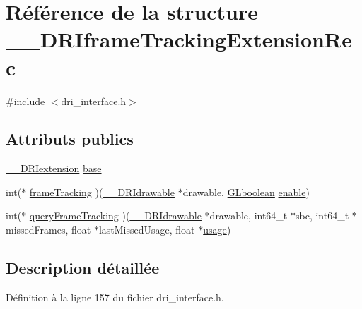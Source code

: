 \hypertarget{struct_____d_r_iframe_tracking_extension_rec}{\section{Référence de la structure \-\_\-\-\_\-\-D\-R\-Iframe\-Tracking\-Extension\-Rec}
\label{struct_____d_r_iframe_tracking_extension_rec}
}


{\ttfamily \#include $<$dri\-\_\-interface.\-h$>$}

\subsection*{Attributs publics}
\begin{DoxyCompactItemize}
\item 
\hyperlink{dri__interface_8h_a4e0a61c8ece00d2b2c6792a9a1b55385}{\-\_\-\-\_\-\-D\-R\-Iextension} \hyperlink{struct_____d_r_iframe_tracking_extension_rec_af01dbdf8b0011437192aed241ef2b420}{base}
\item 
int($\ast$ \hyperlink{struct_____d_r_iframe_tracking_extension_rec_a013f6afc10103f82b9e975f37cfc7a45}{frame\-Tracking} )(\hyperlink{dri__interface_8h_a5bfb832a0a08208d95b3bbef439d2262}{\-\_\-\-\_\-\-D\-R\-Idrawable} $\ast$drawable, \hyperlink{gl_8h_aea1419aa8aec5854bd9807b45171029d}{G\-Lboolean} \hyperlink{glext_8h_ab0b5c7de20095d30091485d2c60a3dd5}{enable})
\item 
int($\ast$ \hyperlink{struct_____d_r_iframe_tracking_extension_rec_a9d980a0990814cad8ceae79fc75b4094}{query\-Frame\-Tracking} )(\hyperlink{dri__interface_8h_a5bfb832a0a08208d95b3bbef439d2262}{\-\_\-\-\_\-\-D\-R\-Idrawable} $\ast$drawable, int64\-\_\-t $\ast$sbc, int64\-\_\-t $\ast$missed\-Frames, float $\ast$last\-Missed\-Usage, float $\ast$\hyperlink{glext_8h_ae759ed0394ed5353d8bef2fb755305da}{usage})
\end{DoxyCompactItemize}


\subsection{Description détaillée}


Définition à la ligne 157 du fichier dri\-\_\-interface.\-h.



